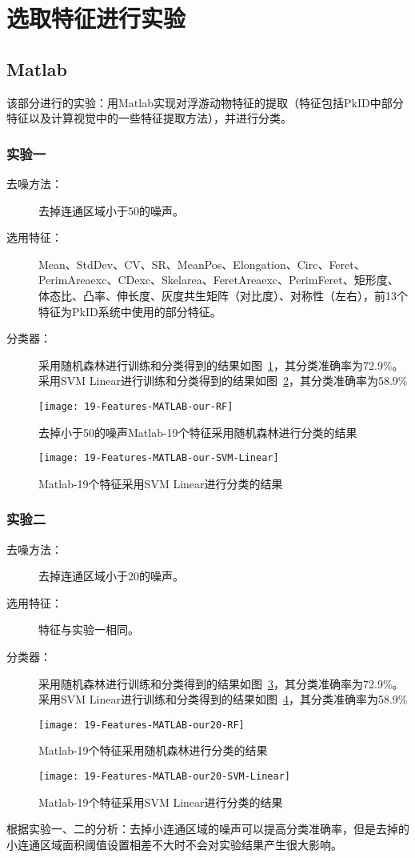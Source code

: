 \section{选取特征进行实验}
\subsection{Matlab}
该部分进行的实验：用Matlab实现对浮游动物特征的提取（特征包括PkID中部分特征以及计算视觉中的一些特征提取方法），并进行分类。

\subsubsection{实验一}
\begin{description}
\item[去噪方法：] 去掉连通区域小于50的噪声。
\item[选用特征：] Mean、StdDev、CV、SR、MeanPos、Elongation、Circ、Feret、PerimAreaexc、CDexc、Skelarea、FeretAreaexc、PerimFeret、矩形度、体态比、凸率、伸长度、灰度共生矩阵（对比度）、对称性（左右），前13个特征为PkID系统中使用的部分特征。
\item[分类器：] 采用随机森林进行训练和分类得到的结果如图~\ref{fig:19-Features-MATLAB-our-RF}，其分类准确率为72.9\%。采用SVM Linear进行训练和分类得到的结果如图~\ref{fig:19-Features-MATLAB-our-SVM-Linear}，其分类准确率为58.9\%
\end{description}
\begin{figure}[!ht]
\centering
\texttt{[image: 19-Features-MATLAB-our-RF]}
\caption{去掉小于50的噪声Matlab-19个特征采用随机森林进行分类的结果}
\label{fig:19-Features-MATLAB-our-RF}
\end{figure}

\begin{figure}[!ht]
\centering
\texttt{[image: 19-Features-MATLAB-our-SVM-Linear]}
\caption{Matlab-19个特征采用SVM Linear进行分类的结果}
\label{fig:19-Features-MATLAB-our-SVM-Linear}
\end{figure}

\subsubsection{实验二}
\begin{description}
\item[去噪方法：] 去掉连通区域小于20的噪声。
\item[选用特征：] 特征与实验一相同。
\item[分类器：] 采用随机森林进行训练和分类得到的结果如图~\ref{fig:19-Features-MATLAB-our20-RF}，其分类准确率为72.9\%。采用SVM Linear进行训练和分类得到的结果如图~\ref{fig:19-Features-MATLAB-our20-SVM-Linear}，其分类准确率为58.9\%
\end{description}
\begin{figure}[!ht]
\centering
\texttt{[image: 19-Features-MATLAB-our20-RF]}
\caption{Matlab-19个特征采用随机森林进行分类的结果}
\label{fig:19-Features-MATLAB-our20-RF}
\end{figure}

\begin{figure}[!ht]
\centering
\texttt{[image: 19-Features-MATLAB-our20-SVM-Linear]}
\caption{Matlab-19个特征采用SVM Linear进行分类的结果}
\label{fig:19-Features-MATLAB-our20-SVM-Linear}
\end{figure}

根据实验一、二的分析：去掉小连通区域的噪声可以提高分类准确率，但是去掉的小连通区域面积阈值设置相差不大时不会对实验结果产生很大影响。
